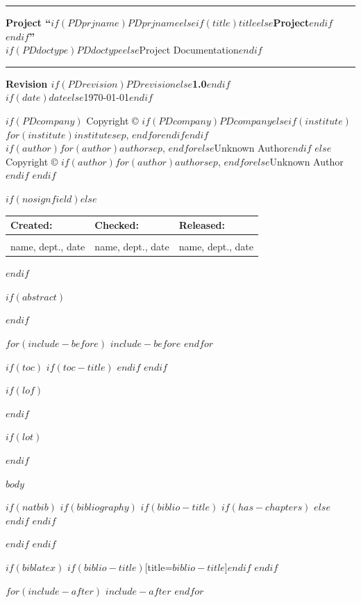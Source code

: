 \documentclass[english$if(classoption)$,$for(classoption)$$classoption$$sep$,$endfor$$endif$]{article}
\newcommand{\PDauthor}{$if(author)$$for(author)$$author$$sep$, $endfor$$else$Unknown Author$endif$}
\newcommand{\PDcompany}{$if(PDcompany)$$PDcompany$$else$$if(institute)$$for(institute)$$institute$$sep$, $endfor$$endif$$endif$}
\newcommand{\PDprjname}{$if(PDprjname)$$PDprjname$$else$$if(title)$$title$$else$Project$endif$$endif$}
\newcommand{\PDdoctype}{$if(PDdoctype)$$PDdoctype$$else$Project Documentation$endif$}
\newcommand{\PDrevision}{$if(PDrevision)$$PDrevision$$else$1.0$endif$}
\newcommand{\PDtitlepage}{%
  \begin{titlepage}%
    \thispagestyle{empty}%
    \setlength{\parindent}{0mm}%
    \setlength{\parskip}{0mm}%
    \vspace*{\stretch{1}}%
    \rule{\linewidth}{1mm}%
    \begin{flushleft}%
      {\Huge\textbf{Project ``\PDprjname{}''}}\\[5mm]%
      \PDdoctype%
    \end{flushleft}%
    \rule{\linewidth}{1mm}%
    \vspace*{\stretch{1}}%
    \begin{center}%
      {\large\textbf{Revision \PDrevision}}\\%
      $if(date)$$date$$else$\today$endif$%
    \end{center}%
    \vspace*{\stretch{1}}%
    \begin{center}%
      $if(PDcompany)$%
        {\large{}Copyright \copyright{} \PDcompany}\\%
        \PDauthor%
      $else$%
        {\large{}Copyright \copyright{} \PDauthor}%
      $endif$%
    \end{center}%
    \vspace*{\stretch{2}}%
    
    $if(nosignfield)$$else$%
    \begin{tabularx}{\linewidth}{XXX}%
      \toprule%
      \textbf{Created:} & \textbf{Checked:} & \textbf{Released:} \\%
      \midrule%
      & & \\[2cm]%
      \footnotesize{name, dept., date} & \footnotesize{name, dept., date} & \footnotesize{name, dept., date} \\%
      \bottomrule%
    \end{tabularx}%
    $endif$%
    \vspace*{\stretch{1}}%
  \end{titlepage}%
}
\begin{document}
\PDtitlepage

$if(abstract)$
\begin{abstract}
$abstract$
\end{abstract}
\clearpage
$endif$

$for(include-before)$
$include-before$
$endfor$

$if(toc)$
$if(toc-title)$
\renewcommand*\contentsname{$toc-title$}
$endif$
\tableofcontents
\clearpage
$endif$

$if(lof)$
\listoffigures
\clearpage
$endif$

$if(lot)$
\listoftables
\clearpage
$endif$

$body$

$if(natbib)$
$if(bibliography)$
$if(biblio-title)$
$if(has-chapters)$
\renewcommand\bibname{$biblio-title$}
$else$
\renewcommand\refname{$biblio-title$}
$endif$
$endif$

$endif$
$endif$

$if(biblatex)$
\printbibliography$if(biblio-title)$[title=$biblio-title$]$endif$
$endif$

$for(include-after)$
$include-after$
$endfor$
\end{document}
